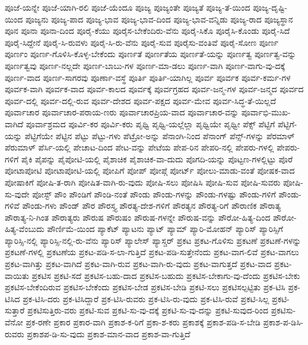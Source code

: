 {ಪೂಜೆ-ಯನ್ನೇ
ಪೂಜೆ-ಯಾಗಿ-ರಲಿ
ಪೂಜೆ-ಯೆಂದೂ
ಪೂಜ್ಯ
ಪೂಜ್ಯಂತೇ
ಪೂಜ್ಯತೆ
ಪೂಜ್ಯ-ತೆ-ಯಿಂದ
ಪೂಜ್ಯ-ದೃಷ್ಟಿ-ಯಿಂದ
ಪೂಜ್ಯನು
ಪೂಜ್ಯ-ಪಾದ
ಪೂಜ್ಯ-ಭಾವ
ಪೂಜ್ಯ-ಭಾವ-ದಿಂದ
ಪೂಜ್ಯ-ಭಾವ-ವನ್ನಿಡು
ಪೂಜ್ಯ-ರಾದ
ಪೂಜ್ಯಸ್ಥಾನ
ಪೂನ
ಪೂನಾ
ಪೂನಾ-ದಿಂದ
ಪೂರೈ-ಕೆಯು
ಪೂರೈಸ-ಬೇಕೆಂದಿರು-ವೆನು
ಪೂರೈ-ಸಿಕೊ
ಪೂರೈಸಿ-ಕೊಂಡು
ಪೂರೈ-ಸಿದೆ
ಪೂರೈ-ಸಿದ್ದೇನೆ
ಪೂರೈ-ಸಿ-ರುವಳು
ಪೂರೈ-ಸಿ-ರು-ವೆನು
ಪೂರೈ-ಸುವ
ಪೂರೈಸು-ವಂತಿವೆ
ಪೂರೈ-ಸೋಣ
ಪೂರ್ಣ
ಪೂರ್ಣಂ
ಪೂರ್ಣ-ಗೊಳಿಸಿ-ಕೊಳ್ಳ-ಬೇಕೆಂದು
ಪೂರ್ಣತೆ
ಪೂರ್ಣತೆಯ
ಪೂರ್ಣತೆ-ಯನ್ನು
ಪೂರ್ಣತ್ವ
ಪೂರ್ಣತ್ವ-ವನ್ನು
ಪೂರ್ಣತ್ವವು
ಪೂರ್ಣ-ನಲ್ಲದೇ
ಪೂರ್ಣ-ಬಾಬು-ಗಳ
ಪೂರ್ಣ-ಮಾ-ಡಲು
ಪೂರ್ಣ-ವಾಗಿ
ಪೂರ್ಣ-ವಾಗು-ವು-ದಕ್ಕೆ
ಪೂರ್ಣ-ವಾದ
ಪೂರ್ಣ-ಸಾಗರವು
ಪೂರ್ಣಾ-ವಸ್ಥೆ
ಪೂರ್ತಿ
ಪೂರ್ತಿ-ಯಾಗಿಲ್ಲ
ಪೂರ್ವ
ಪೂರ್ವಕ
ಪೂರ್ವ-ಕರ್ಮ-ಗಳ
ಪೂರ್ವಕ-ವಾಗಿ
ಪೂರ್ವಕ-ವಾದ
ಪೂರ್ವ-ಕಾಲದ
ಪೂರ್ವಕ್ಕೆ
ಪೂರ್ವಗ್ರಹದ
ಪೂರ್ವ-ಜನ್ಮ-ಗಳ
ಪೂರ್ವ-ಜನ್ಮದ
ಪೂರ್ವದ
ಪೂರ್ವ-ದಲ್ಲಿ
ಪೂರ್ವ-ದಲ್ಲಿ-ರುವ
ಪೂರ್ವ-ದೇಶದ
ಪೂರ್ವ-ಪಕ್ಷದ
ಪೂರ್ವ-ಮೇವ
ಪೂರ್ವ-ಸಿದ್ಧ-ತೆ-ಯಿಲ್ಲದೆ
ಪೂರ್ವಾಚಾರ
ಪೂರ್ವಾಚಾರ-ಪರಾಯ-ಣರು
ಪೂರ್ವಾಚಾರಪ್ರಿಯ-ವಾದ
ಪೂರ್ವಾಚಾರ-ವನ್ನು
ಪೂರ್ವಾಭಿ-ಮುಖ-ವಾಗಿದೆ
ಪೂರ್ವಾಶ್ರಮದ
ಪೂರ್ವಿ-ಕರ
ಪೂರ್ವಿ-ಕರು
ಪೃಥ್ವಿ
ಪೃಥ್ವಿ-ಯಲ್ಲೆಲ್ಲಾ
ಪೃಥ್ವಿಯೇ
ಪೃಥ್ವೀ
ಪೆಕ್ಸ್
ಪೆಟ್ಟಿಗೆ
ಪೆಟ್ಟಿಗೆ-ಯನ್ನು
ಪೆಟ್ಟಿಗೆಯೇ
ಪೆಟ್ಟಿನ
ಪೆಟ್ಟು
ಪೆಟ್ಟು-ಗಳು
ಪೆಟ್ರೋ-ಅನ್ನು
ಪೆನಾಂಗಿ-ನಿಂದ
ಪೆನಾಂಗ್
ಪೆನ್ಸ್-ಗಳನ್ನು
ಪೆರಮಾಳ್
ಪೆರುಮಾಳ್
ಪೆರ್ಸಿ-ಯಲ್ಲಿ
ಪೇಚಾಟ-ದಿಂದ
ಪೇಟ-ವನ್ನು
ಪೇಟೆಯ
ಪೇಪ-ರಿನ
ಪೇಪರಿ-ನಲ್ಲಿ
ಪೇಪರು-ಗಳಲ್ಲಿ
ಪೇಪರು-ಗಳಿಗೆ
ಪೈಕಿ
ಪೈಪನ್ನು
ಪೈಪೋಟಿ-ಯಲ್ಲಿ
ಪೈಶಾಚಿಕ
ಪೈಶಾಚಿಕ-ವಾ-ದುದು
ಪೊಗದಿ-ಯನ್ನು
ಪೊಟ್ಟಣ-ಗಳಲ್ಲಿಟ್ಟು
ಪೊರೆ
ಪೋಟಾಪೋಟಿ
ಪೋಟಾಪೋಟಿ-ಯಲ್ಲಿ
ಪೋಪಿಗೆ
ಪೋಪ್
ಪೋಪ್ಗೆ
ಪೋರ್ಟ್
ಪೋಲು-ಮಾಡು-ವಂತೆ
ಪೋಷಕ-ವಾದ
ಪೋಷಾಕಿಗೆ
ಪೋಷಿ-ತ-ರಾಗಿ
ಪೋಷಿತ-ವಾಗಿ-ರು-ವುದು
ಪೋಷಿ-ಸಲು
ಪೋಷಿಸಿ
ಪೋಷಿ-ಸುವ
ಪೋಷಿ-ಸುವರು
ಪೋಷಿ-ಸು-ವುದೇ
ಪೋಸ್ಟ್
ಪೌಂ
ಪೌಂಡಿಗೆ
ಪೌಂಡಿ-ನಂತೆ
ಪೌಂಡು
ಪೌಂಡು-ಗಳನ್ನು
ಪೌಂಡು-ಗಳಷ್ಟು
ಪೌಂಡು-ಗಳಿಗೆ
ಪೌಂಡು-ಗಳಿವೆ
ಪೌಂಡು-ಗಳು
ಪೌಂಡ್
ಪೌರ
ಪೌರಸ್ತ್ಯ
ಪೌರತ್ಯ-ದೇಶ-ಗಳಿಗೆ
ಪೌರತ್ಯನ
ಪೌರತ್ಯ-ರಿಗೆ
ಪೌರಾಣಿಕ
ಪೌರಾತ್ಯ
ಪೌರಾತ್ಯ-ನಿ-ಗಿಂತ
ಪೌರಾತ್ಯರು
ಪೌರುಷ
ಪೌರುಷಂ
ಪೌರುಷ-ಗಳನ್ನೇ
ಪೌರುಷ-ವನ್ನು
ಪೌರೋ-ಹಿತ್ಯ-ದಿಂದ
ಪೌರೋ-ಹಿತ್ಯ-ವೆಂಬುದು
ಪೌರ್ಣಿಮೆ-ಯಿಂದ
ಪ್ಯಾಕೆಟ್
ಪ್ಯಾಟನು
ಪ್ಯಾಟ್
ಪ್ಯಾಮ್
ಪ್ಯಾರಿ-ಮೋಹನ್
ಪ್ಯಾರಿಸ್
ಪ್ಯಾರಿಸ್ಸಿಗೆ
ಪ್ಯಾರಿಸ್ಸಿ-ನಲ್ಲಿ
ಪ್ಯಾರಿಸ್ಸಿ-ನಲ್ಲಿ-ರು-ವೆನು
ಪ್ಯಾರಿಸ್
ಪ್ಯಾಲೇಸ್
ಪ್ಯಾಸ್ಚರ್
ಪ್ರಕಟ
ಪ್ರಕಟ-ಗೊಳಿಸು
ಪ್ರಕಟಣೆ
ಪ್ರಕಟಣೆ-ಗಳನ್ನು
ಪ್ರಕಟಣೆ-ಗಳಲ್ಲಿ
ಪ್ರಕಟಣೆಯ
ಪ್ರಕಟ-ಪಡಿ-ಸ-ಲಾ-ಗುತ್ತಿದೆ
ಪ್ರಕಟ-ಪಡಿ-ಸುತ್ತೇನೆಂದು
ಪ್ರಕಟ-ವಾಗ-ಲಿವೆ
ಪ್ರಕಟ-ವಾಗಲು
ಪ್ರಕಟ-ವಾಗಿತ್ತು
ಪ್ರಕಟ-ವಾಗಿದೆ
ಪ್ರಕಟ-ವಾಗಿ-ರುವ
ಪ್ರಕಟ-ವಾಗಿ-ರು-ವುದು
ಪ್ರಕಟ-ವಾಗುತ್ತದೆ
ಪ್ರಕಟ-ವಾದ
ಪ್ರಕಟ-ವಾಯಿತು
ಪ್ರಕಟಿಸ
ಪ್ರಕಟಿ-ಸದೆ
ಪ್ರಕಟಿಸ-ಬಹು-ದಾದ
ಪ್ರಕಟಿಸ-ಬಹುದು
ಪ್ರಕಟಿಸ-ಬೇಕಾಗು-ವು-ದೆಂದು
ಪ್ರಕಟಿಸ-ಬೇಕು
ಪ್ರಕಟಿಸ-ಬೇಕೆಂದಿರುವ
ಪ್ರಕಟಿಸ-ಬೇಕೆಂದು
ಪ್ರಕಟಿಸ-ಬೇಡ
ಪ್ರಕಟಿಸ-ಬೇಡಿ
ಪ್ರಕಟಿ-ಸಲು
ಪ್ರಕಟಿಸಲ್ಪಟ್ಟಿತು
ಪ್ರಕ-ಟಿಸಿ
ಪ್ರಕ-ಟಿಸಿದ
ಪ್ರಕ-ಟಿಸಿ-ದರು
ಪ್ರಕ-ಟಿಸಿದ್ದಾರೆ
ಪ್ರಕ-ಟಿಸಿ-ರುವರು
ಪ್ರಕ-ಟಿಸಿ-ರು-ವುದು
ಪ್ರಕ-ಟಿಸಿ-ರುವೆ
ಪ್ರಕಟಿ-ಸಿಲ್ಲ
ಪ್ರಕಟಿ-ಸುತ್ತಾರೆ
ಪ್ರಕಟಿಸುತ್ತಿರು-ವರು
ಪ್ರಕಟಿ-ಸುವ
ಪ್ರಕಟಿ-ಸು-ವು-ದಕ್ಕೆ
ಪ್ರಕಟಿ-ಸು-ವು-ದನ್ನು
ಪ್ರಕಟಿ-ಸುವುದ-ರಿಂದ
ಪ್ರಕಟಿಸು-ವೆನೋ
ಪ್ರಕ-ರಣೇ
ಪ್ರಕಾರ
ಪ್ರಕಾರ-ವಾಗಿ
ಪ್ರಕಾಶ-ಕ-ರಿಗೆ
ಪ್ರಕಾ-ಶ-ಕರು
ಪ್ರಕಾಶಕ್ಕೆ
ಪ್ರಕಾಶ-ಪಡಿ-ಸ-ಬೇಡಿ
ಪ್ರಕಾಶ-ಪ-ಡಿಸಿ-ರುವರು
ಪ್ರಕಾಶಪ-ಡಿ-ಸು-ವುದು
ಪ್ರಕಾಶ-ಮಾನ-ವಾದ
ಪ್ರಕಾಶ-ವಾ-ಗುತ್ತಿದೆ
}
